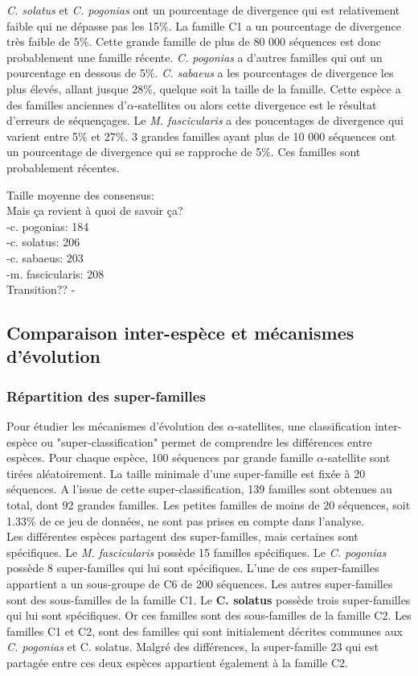 \documentclass[12pt,a4paper]{article}
\begin{document}
	\textit{C. solatus} et \textit{C. pogonias} ont un pourcentage de divergence qui est relativement faible qui ne dépasse pas les 15\%. La  famille C1 a un pourcentage de divergence très faible de 5\%. Cette grande famille de plus de 80 000 séquences est donc probablement une famille récente.  \textit{C. pogonias} a d'autres familles qui ont un pourcentage en dessous de 5\%.
	\textit{C. sabaeus} a les pourcentages de divergence les plus élevés, allant jusque 28\%, quelque soit la taille de la famille. Cette espèce a des familles anciennes d'$\alpha$-satellites ou alors cette divergence est le résultat d'erreurs de séquençages. Le \textit{M. fascicularis} a des poucentages de divergence qui varient entre 5\% et 27\%. 3 grandes familles ayant plus de 10 000 séquences ont un pourcentage de divergence qui se rapproche de 5\%. Ces familles sont probablement récentes.
	
	Taille moyenne des consensus:\\ Mais ça revient à quoi de savoir ça?\\
	-c. pogonias: 184\\
	-c. solatus: 206\\
	-c. sabaeus: 203\\
	-m. fascicularis: 208\\

Transition??
-

	
	\subsection{Comparaison inter-espèce et mécanismes d'évolution}
	\subsubsection{Répartition des super-familles}
				Pour étudier les mécanismes d'évolution des $\alpha$-satellites, une classification inter-espèce ou "super-classification" permet de comprendre les différences entre espèces. Pour chaque espèce, 100 séquences par grande famille  $\alpha$-satellite sont tirées aléatoirement. La taille minimale d'une super-famille est fixée à 20 séquences. A l'issue de cette super-classification, 139 familles sont obtenues au total, dont 92 grandes familles. Les petites familles de moins de 20 séquences, soit 1.33\% de ce jeu de données, ne sont pas prises en compte dans l'analyse.\\
				
				Les différentes espèces partagent des super-familles, mais certaines sont spécifiques. Le \textit{M. fascicularis} possède 15 familles spécifiques. Le \textit{C. pogonias} possède 8 super-familles qui lui sont spécifiques. L'une de ces super-familles appartient a un sous-groupe de C6 de 200 séquences. Les autres super-familles sont des sous-familles de la famille C1. Le \textbf{C. solatus} possède trois super-familles qui lui sont spécifiques. Or ces familles sont des sous-familles de la famille C2. Les familles C1 et C2, sont des familles qui sont initialement décrites communes aux \textit{C. pogonias} et {C. solatus}. Malgré des différences, la super-famille 23 qui est partagée entre ces deux espèces appartient également à la famille C2.
				
\end{document}
